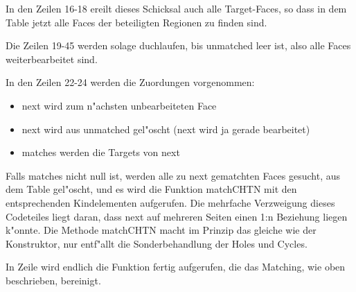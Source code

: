 \documentclass[a4paper,10pt,twoside]{scrreprt}
\begin{document}
In den Zeilen 16-18 ereilt dieses Schicksal auch alle Target-Faces, so dass in dem Table jetzt alle Faces der beteiligten Regionen zu finden sind.

Die Zeilen 19-45 werden solage duchlaufen, bis unmatched leer ist, also alle Faces weiterbearbeitet sind.

In den Zeilen 22-24 werden die Zuordungen vorgenommen:
\begin{itemize}
\item next wird zum n"achsten unbearbeiteten Face
\item next wird aus unmatched gel"oscht (next wird ja gerade bearbeitet)
\item matches werden die Targets von next

\end{itemize} 
Falls matches nicht null ist, werden alle zu next gematchten Faces gesucht, aus dem Table gel"oscht, und es wird die Funktion matchCHTN mit den entsprechenden Kindelementen aufgerufen. Die mehrfache Verzweigung dieses Codeteiles liegt daran, dass next auf mehreren Seiten einen 1:n Beziehung liegen k"onnte. Die Methode matchCHTN macht im Prinzip das gleiche wie der Konstruktor, nur entf"allt die Sonderbehandlung der Holes und Cycles.

In Zeile wird endlich die Funktion fertig aufgerufen, die das Matching, wie oben beschrieben, bereinigt.





\end{document}

